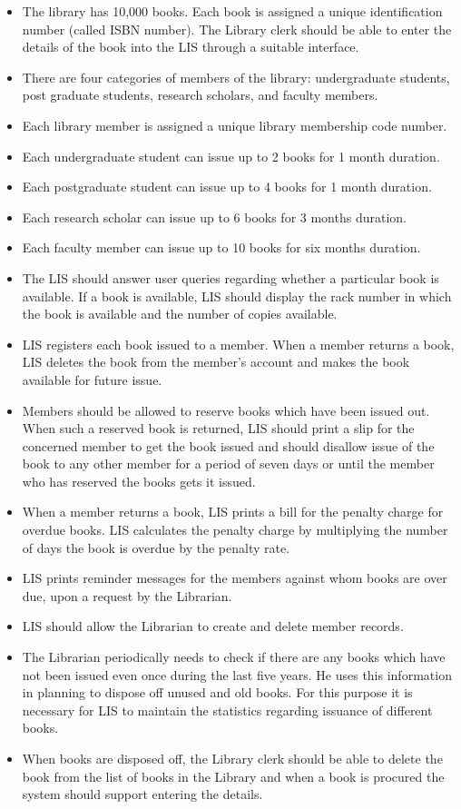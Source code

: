 \documentclass{article}
\begin{document}
\begin{itemize}
\item The library has 10,000 books. Each book is assigned a unique identification number (called ISBN number).
The Library clerk should be able to enter the details of the book into the LIS through a suitable interface.
\item There are four categories of members of the library: undergraduate students, post graduate students,
research scholars, and faculty members.
\item Each library member is assigned a unique library membership code number.
\item Each undergraduate student can issue up to 2 books for 1 month duration.
\item Each postgraduate student can issue up to 4 books for 1 month duration.
\item Each research scholar can issue up to 6 books for 3 months duration.
\item Each faculty member can issue up to 10 books for six months duration.
\item The LIS should answer user queries regarding whether a particular book is available. If a book is available,
LIS should display the rack number in which the book is available and the number of copies available.
\item LIS registers each book issued to a member. When a member returns a book, LIS deletes the book from
the member’s account and makes the book available for future issue.
\item Members should be allowed to reserve books which have been issued out. When such a reserved book is
returned, LIS should print a slip for the concerned member to get the book issued and should disallow
issue of the book to any other member for a period of seven days or until the member who has reserved
the books gets it issued.
\item When a member returns a book, LIS prints a bill for the penalty charge for overdue books. LIS calculates
the penalty charge by multiplying the number of days the book is overdue by the penalty rate.
\item LIS prints reminder messages for the members against whom books are over due, upon a request by the
Librarian.
\item LIS should allow the Librarian to create and delete member records.
\item The Librarian periodically needs to check if there are any books which have not been issued even once
during the last five years. He uses this information in planning to dispose off unused and old books. For
this purpose it is necessary for LIS to maintain the statistics regarding issuance of different books.
\item When books are disposed off, the Library clerk should be able to delete the book from the list of books
in the Library and when a book is procured the system should support entering the details.
\end{itemize}
\end{document}
